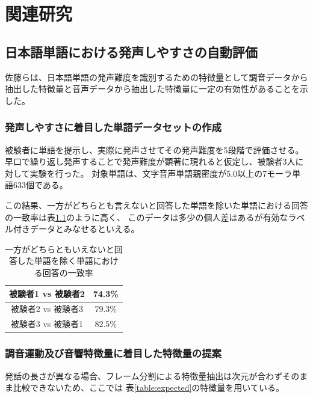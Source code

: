 \documentclass[10.5ptj,a4j,dvipdfmx,uplatex, oneside, openany, report]{jsbook}%
\begin{document}
\chapter{関連研究}


\section{日本語単語における発声しやすさの自動評価}
佐藤らは、日本語単語の発声難度を識別するための特徴量として調音データから抽出した特徴量と音声データから抽出した特徴量に一定の有効性があることを示した\cite{sato}。

\subsection{発声しやすさに着目した単語データセットの作成}
被験者に単語を提示し、実際に発声させてその発声難度を5段階で評価させる。
早口で繰り返し発声することで発声難度が顕著に現れると仮定し、被験者3人に対して実験を行った。
対象単語は、文字音声単語親密度が5.0以上の7モーラ単語633個である。

この結果、一方がどちらとも言えないと回答した単語を除いた単語における回答の一致率は表\ref{table:answer}のように高く、
このデータは多少の個人差はあるが有効なラベル付きデータとみなせるといえる。

\begin{table}[htbp]
    \small
    \caption{一方がどちらともいえないと回答した単語を除く単語における回答の一致率}
    \label{table:answer}
    \centering
    \begin{tabular}{cc}
        \hline
        被験者1 vs 被験者2 & 74.3\% \\
        \hline 
        被験者2 vs 被験者3 & 79.3\% \\
        \hline
        被験者3 vs 被験者1 & 82.5\% \\
        \hline
    \end{tabular}
\end{table}

\subsection{調音運動及び音響特徴量に着目した特徴量の提案}
発話の長さが異なる場合、フレーム分割による特徴量抽出は次元が合わずそのまま比較できないため、ここでは
表\ref{table:expected}の特徴量を用いている。
\end{document}
